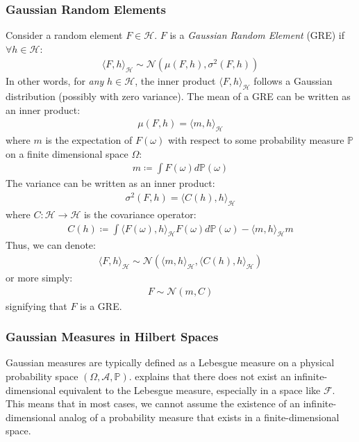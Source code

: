 \documentclass{article}
\numberwithin{equation}{section}
\begin{document}
\subsubsection{Gaussian Random Elements}
 Consider a random element $F \in \mathcal{H}$. $F$ is a \textit{Gaussian Random Element} (GRE) if $\forall h \in \mathcal{H}$:
\begin{align}
    \langle F, h \rangle_\mathcal{H} \sim \mathcal{N}(\mu(F, h), \sigma^2(F, h))
\end{align}
In other words, for \textit{any} $h \in \mathcal{H}$, the inner product $\langle F, h \rangle_\mathcal{H}$ follows a Gaussian distribution (possibly with zero variance). The mean of a GRE can be written as an inner product:
\begin{align}
\mu(F, h) = \langle m, h\rangle_{\mathcal{H}}
\end{align}
where $m$ is the expectation of $F(\omega)$ with respect to some probability measure $\mathbb{P}$ on a finite dimensional space $\Omega$:
\begin{align}
    \label{gm-mean}
    m \coloneqq \int F(\omega) d \mathbb{P}(\omega)
\end{align}
The variance can be written as an inner product:
\begin{align}
\sigma^2(F, h) = \langle C(h), h\rangle_{\mathcal{H}}
\end{align}
where $C: \mathcal{H} \rightarrow \mathcal{H}$ is the covariance operator:
\begin{align}
    \label{gm-covariance}
    C(h) \coloneqq \int \langle F(\omega), h\rangle_{\mathcal{H}} F(\omega)d \mathbb{P}(\omega) - \langle m, h\rangle_{\mathcal{H}} m
\end{align}
Thus, we can denote:
\begin{align}
    \langle F, h\rangle_{\mathcal{H}} \sim \mathcal{N}\left(  \langle m, h\rangle_{\mathcal{H}},  \langle C(h), h\rangle_{\mathcal{H}}\right)
\end{align}
or more simply:
\begin{align}
    F \sim \mathcal{N}(m, C)
\end{align}
signifying that $F$ is a GRE.

\subsubsection{Gaussian Measures in Hilbert Spaces}
Gaussian measures are typically defined as a Lebesgue measure on a physical probability space $(\Omega, \mathcal{A}, \mathbb{P})$. \cite{matthews2016sparse} explains that there does not exist an infinite-dimensional equivalent to the Lebesgue measure, especially in a space like $\mathcal{F}$. This means that in most cases, we cannot assume the existence of an infinite-dimensional analog of a probability measure that exists in a finite-dimensional space. 
\end{document}

